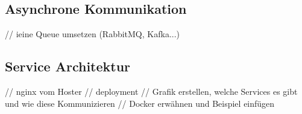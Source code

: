 
\subsection{Asynchrone  Kommunikation}
// ieine Queue umsetzen (RabbitMQ, Kafka...)

\subsection{Service Architektur}
// nginx vom Hoster
// deployment
// Grafik erstellen, welche Services es gibt und wie diese Kommunizieren 
// Docker erwähnen und Beispiel einfügen




